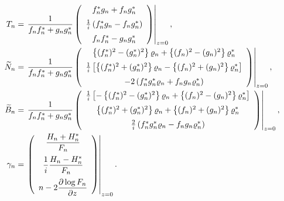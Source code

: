 \documentclass[10pt,leqno]{amsart}
\numberwithin{equation}{section}
\begin{document}
\begin{align}\label{T}
  T_{n} &=\left. \frac{1}{f_{n}f_{n}^{*}+g_{n}g_{n}^{*}} \left(
    \begin{array}{c}
   \vspace{2mm}
      f_{n}^{*}g_{n}+f_{n}g_{n}^{*} \\
      \vspace{2mm}
      \frac{1}{i}\left(f_{n}^{*}g_{n}-f_{n}g_{n}^{*}\right) \\
      f_{n}f_{n}^{*}-g_{n}g_{n}^{*}
    \end{array}
  \right)\right|_{z=0}, \\
  \widetilde{N}_{n}&=\left.\frac{1}{f_{n}f_{n}^{*}+g_{n}g_{n}^{*}} \left(
    \begin{array}{c}
    \vspace{2mm}
      \left\{(f_{n}^{*})^{2}-(g_{n}^{*})^{2}\right\}\varrho_{n}+ \left\{(f_{n})^{2}-(g_{n})^{2}\right\}\varrho_{n}^{*} \\
      \vspace{2mm}
      \frac{1}{i}\left[\left\{(f_{n}^{*})^{2}+(g_{n}^{*})^{2}\right\}\varrho_{n}-\left\{(f_{n})^{2}+(g_{n})^{2}\right\}\varrho_{n}^{*}\right] \\
      -2\left(f_{n}^{*}g_{n}^{*}\varrho_{n}+f_{n}g_{n}\varrho_{n}^{*}\right)
    \end{array}
  \right)\right|_{z=0}, \nonumber\\
  \widetilde{B}_{n}&=\left. \frac{1}{f_{n}f_{n}^{*}+g_{n}g_{n}^{*}} \left(
    \begin{array}{c}
    \vspace{2mm}
       \frac{1}{i}\left[-\left\{(f_{n}^{*})^{2}-(g_{n}^{*})^{2}\right\}\varrho_{n}+ \left\{(f_{n})^{2}-(g_{n})^{2}\right\}\varrho_{n}^{*}\right] \\
       \vspace{2mm}
      \left\{(f_{n}^{*})^{2}+(g_{n}^{*})^{2}\right\}\varrho_{n}+ \left\{(f_{n})^{2}+(g_{n})^{2}\right\}\varrho_{n}^{*} \\
      \frac{2}{i}\left(f_{n}^{*}g_{n}^{*}\varrho_{n}-f_{n}g_{n}\varrho_{n}^{*}\right)
    \end{array}
  \right)\right|_{z=0}, \nonumber \\
 \gamma_{n}&= \left.\left(
        \begin{array}{c}
        \vspace{2mm}
    \dfrac{H_{n}+H_{n}^*}{F_{n}}\\
    \vspace{2mm}
    \dfrac{1}{i}\dfrac{H_{n}-H_{n}^*}{F_{n}}\\
    n-2\dfrac{\partial\log F_{n}}{\partial z}
        \end{array}
      \right) \right|_{z=0}. \nonumber  
\end{align}
\end{document}
